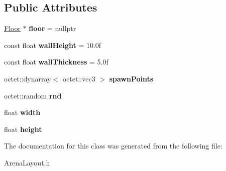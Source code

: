 \subsection*{Public Attributes}
\begin{DoxyCompactItemize}
\item 
\hypertarget{class_arena_1_1_arena_layout_aa49c66cee438ffafe7faf305881e03f5}{\hyperlink{class_arena_1_1_floor}{Floor} $\ast$ {\bfseries floor} = nullptr}\label{class_arena_1_1_arena_layout_aa49c66cee438ffafe7faf305881e03f5}

\item 
\hypertarget{class_arena_1_1_arena_layout_a0509503437cfceb1cb9d790120deb543}{const float {\bfseries wall\+Height} = 10.\+0f}\label{class_arena_1_1_arena_layout_a0509503437cfceb1cb9d790120deb543}

\item 
\hypertarget{class_arena_1_1_arena_layout_a992a2571751a9ac15fef8c0ce35238e4}{const float {\bfseries wall\+Thickness} = 5.\+0f}\label{class_arena_1_1_arena_layout_a992a2571751a9ac15fef8c0ce35238e4}

\item 
\hypertarget{class_arena_1_1_arena_layout_ac583a8ac41bc5478c1ca78139595fd07}{octet\+::dynarray$<$ octet\+::vec3 $>$ {\bfseries spawn\+Points}}\label{class_arena_1_1_arena_layout_ac583a8ac41bc5478c1ca78139595fd07}

\item 
\hypertarget{class_arena_1_1_arena_layout_a3070a129044e033eaa3d57691e36a0d8}{octet\+::random {\bfseries rnd}}\label{class_arena_1_1_arena_layout_a3070a129044e033eaa3d57691e36a0d8}

\item 
\hypertarget{class_arena_1_1_arena_layout_a3c1d6c20432a09b05eea93a50c304dc1}{float {\bfseries width}}\label{class_arena_1_1_arena_layout_a3c1d6c20432a09b05eea93a50c304dc1}

\item 
\hypertarget{class_arena_1_1_arena_layout_ae156f858dc91474473461417e6cb0d27}{float {\bfseries height}}\label{class_arena_1_1_arena_layout_ae156f858dc91474473461417e6cb0d27}

\end{DoxyCompactItemize}


The documentation for this class was generated from the following file\+:\begin{DoxyCompactItemize}
\item 
Arena\+Layout.\+h\end{DoxyCompactItemize}

